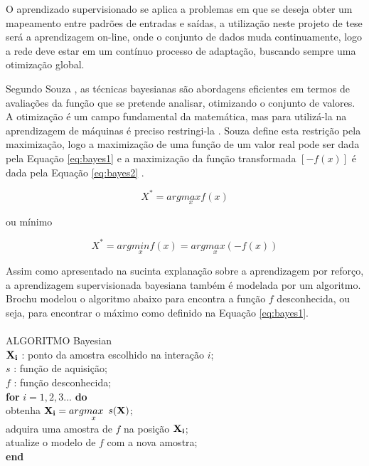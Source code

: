 O aprendizado supervisionado se aplica a problemas em que se deseja obter um mapeamento entre padrões de entradas e saídas, a utilização neste projeto de tese será a aprendizagem on-line, onde o conjunto de dados muda continuamente, logo a rede deve estar em um contínuo processo de adaptação, buscando sempre uma otimização global.

Segundo Souza \cite{sou:14}, as técnicas bayesianas são abordagens eficientes em termos de avaliações da função que se pretende analisar, otimizando o conjunto de valores.
A otimização é um campo fundamental da matemática, mas para utilizá-la na aprendizagem de máquinas é preciso restringi-la \cite{bro:10}. Souza \cite{sou:14} define esta restrição pela maximização, logo a maximização de uma função de um valor real pode ser dada pela Equação \ref{eq:bayes1} e a maximização da função transformada $[-f(x)]$ é dada pela Equação \ref{eq:bayes2} .

\begin{equation} \label{eq:bayes1}
X^* = arg \underset{x}{max} f(x) 	
\end{equation}

ou mínimo

\begin{equation} \label{eq:bayes2}
X^* = arg \underset{x}{min} f(x)  = arg \underset{x}{max} (-f(x))
\end{equation}

Assim como apresentado na sucinta explanação sobre a aprendizagem por reforço, a aprendizagem supervisionada bayesiana também é modelada por um algoritmo. Brochu \cite{bro:10} modelou o algoritmo abaixo para encontra a função $f$ desconhecida, ou seja, para encontrar o máximo como definido na Equação \ref{eq:bayes1}.\\

\hline\hline\\
\vspace*{0.2cm}
\noindent ALGORITMO Bayesian
\vspace*{0.2cm}
\hline\hline\\
\vspace*{0.5cm}
\noindent ${\bf X_i}$ : ponto da amostra escolhido na interação $i$;\\
\noindent $s$ : função de aquisição;\\
\noindet $f$ : função desconhecida;\\
{\bf for} $i = 1,2,3 ...$ {\bf do}\\
\indent obtenha ${\bf X_i} = arg \underset{x}{max}$  $s({\bf X})$;\\
\indent adquira uma amostra de $f$ na posição ${\bf X_i}$;\\
\indent atualize o modelo de $f$ com a nova amostra;\\
{\bf end}\\


